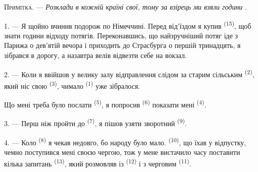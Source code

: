 %

\VUsaut{4.0mm}
\VUsaut{2.4mm}
\VUsaut{3.4mm}
\textsc{Примітка.} --- \textit{Розклади в кожній країні свої, тому за взірець ми
взяли години} .

1. --- Я щойно вчинив подорож по Німеччині. Перед від'їздом я купив
 \textsuperscript{(15)}, щоб знати години відходу потягів.
Переконавшись, що найзручніший потяг іде з Парижа о дев'ятій вечора і приходить
до Страсбурга о першій тринадцять, я зібрався в дорогу, а назавтра велів
відвезти себе на вокзал.

2. --- Коли я ввійшов у велику залу відправлення слідом за старим сільським
 \textsuperscript{(2)}, який ніс свою 
\textsuperscript{(3)}, чимало  \textsuperscript{(1)} уже
зібралося.

Що мені треба було послати  \textsuperscript{(5)}, я попросив
 \textsuperscript{(6)} показати мені 
\textsuperscript{(4)}.

3. --- Перш ніж пройти до  \textsuperscript{(7)}, я пішов
узяти зворотний  \textsuperscript{(9)}.

4. --- Коло  \textsuperscript{(8)} я чекав недовго, бо народу було
мало.  \textsuperscript{(10)}, що їхав у відпустку, чемно
поступився мені своєю чергою, тож у мене вистачило часу поставити кілька
запитань  \textsuperscript{(13)}, який розмовляв із
 \textsuperscript{(12)} і з черговим
 \textsuperscript{(11)}.

